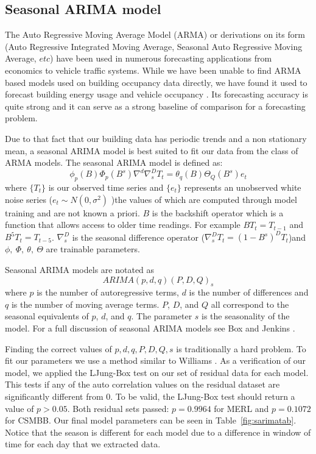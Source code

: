 \subsection{Seasonal ARIMA model}
The Auto Regressive Moving Average Model (ARMA) or derivations on its form (Auto Regressive Integrated Moving Average, Seasonal Auto Regressive Moving Average, $etc$) have been used in numerous forecasting applications from economics to vehicle traffic systems.  While we have been unable to find ARMA based models used on building occupancy data directly, we have found it used to forecast building energy usage and vehicle occupancy \cite{Williams2003, Hong2011, Newsham2010}.  Its forecasting accuracy is quite strong and it can serve as a strong baseline of comparison for a forecasting problem.  

Due to that fact that our building data has periodic trends and a non stationary mean, a seasonal ARIMA model is best suited to fit our data from the class of ARMA models.  The seasonal ARIMA model is defined as:
\begin{equation}
\label{eq:sarima}
\phi_{p}(B)\Phi_{p}(B^{s})\nabla^{d}\nabla^{D}_{s}T_{t} = \theta_{q}(B)\Theta_{Q}(B^{s})e_{t}
\end{equation}
\noindent
where $\{T_{t}\}$ is our observed time series and $\{e_t\}$ represents an unobserved white noise series ($e_{t} \sim N(0, \sigma^{2})$ )the values of which are computed through model training and are not known a priori.  $B$ is the backshift operator which is a function that allows access to older time readings.  For example $BT_{t} = T_{t-1}$ and $B^{5}T_{t} = T_{t-5}$.  $\nabla^{D}_{s}$ is the seasonal difference operator ($\nabla^{D}_{s}T_{t} = (1 - B^{s})^{D}T_{t}$)and $\phi,\  \Phi,\  \theta,\ \Theta$ are trainable parameters.  

Seasonal ARIMA models are notated as
\begin{equation}
ARIMA(p,d,q)(P,D,Q)_{s}
\end{equation}
where $p$ is the number of autoregressive terms, $d$ is the number of differences and $q$ is the number of moving average terms.  $P$, $D$, and $Q$ all correspond to the seasonal equivalents of $p$, $d$, and $q$.  The parameter $s$ is the seasonality of the model.  For a full discussion of seasonal ARIMA models see Box and Jenkins \cite{Box2008}.

Finding the correct values of $p, d, q, P, D, Q, s$ is traditionally a hard problem.  To fit our parameters we use a method similar to Williams \cite{Williams2003}.  As a verification of our model, we applied the LJung-Box test \cite{Ljung1978} on our set of residual data for each model.  This tests if any of the auto correlation values on the residual dataset are significantly different from 0.  To be valid, the LJung-Box test should return a value of $p > 0.05$.  Both residual sets passed: $p = 0.9964$ for MERL and $p = 0.1072$ for CSMBB.  Our final model parameters can be seen in Table~\ref{fig:sarimatab}.  Notice that the season is different for each model due to a difference in window of time for each day that we extracted data.

